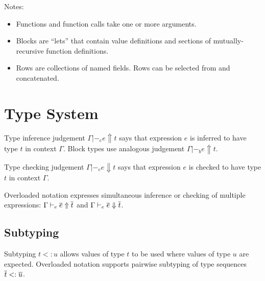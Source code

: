 \documentclass[11pt]{article}
\begin{document}
Notes:
\begin{itemize}
\item Functions and function calls take one or more arguments.
\item Blocks are ``lets'' that contain value definitions and sections of mutually-recursive function definitions.
\item Rows are collections of named fields. Rows can be selected from and concatenated.
\end{itemize}

\newpage

\section{Type System}

\newcommand{\inft}[4]{#2 |-_#1 #3 \Uparrow #4}
\newcommand{\infe}[3]{\inft{e}{#1}{#2}{#3}}
\newcommand{\infb}[3]{\inft{b}{#1}{#2}{#3}}

\newcommand{\chkt}[4]{#2 |-_#1 #3 \Downarrow #4}
\newcommand{\chke}[3]{\chkt{e}{#1}{#2}{#3}}

\newcommand{\rulename}[1]{{\footnotesize #1}}

\newenvironment{rules}[1]
    {\begin{center}\begin{tabular}{#1}}
    {\end{tabular}\end{center}}

Type inference judgement $\infe{\Gamma}{e}{t}$ says that expression $e$ is inferred to have type $t$ in context $\Gamma$.
Block types use analogous judgement $\infb{\Gamma}{e}{t}$.

Type checking judgement $\chke{\Gamma}{e}{t}$ says that expression $e$ is checked to have type $t$ in context $\Gamma$.

Overloaded notation expresses simultaneous inference or checking of multiple expressions: $\infe{\Gamma}{\repo{e}}{\repo{t}}$ and $\chke{\Gamma}{\repo{e}}{\repo{t}}$.

\subsection{Subtyping}

\newcommand{\subtype}[2]{#1 <: #2}

Subtyping $\subtype{t}{u}$ allows values of type $t$ to be used where values of type $u$ are expected.
Overloaded notation supports pairwise subtyping of type sequences $\subtype{\repo{t}}{\repo{u}}$.
\end{document}
